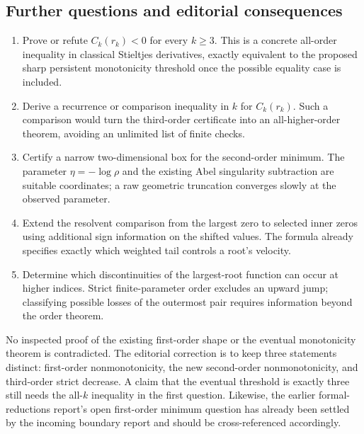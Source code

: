 \documentclass[11pt,a4paper]{article}
\numberwithin{equation}{section}
\theoremstyle{definition}
\theoremstyle{remark}
\begin{document}
\subsection{Further questions and editorial consequences}

\begin{enumerate}
\item Prove or refute $C_k(r_k)<0$ for every $k\geq3$. This is a
      concrete all-order inequality in classical Stieltjes derivatives,
      exactly equivalent to the proposed sharp persistent monotonicity
      threshold once the possible equality case is included.
\item Derive a recurrence or comparison inequality in $k$ for
      $C_k(r_k)$. Such a comparison would turn the third-order certificate
      into an all-higher-order theorem, avoiding an unlimited list of
      finite checks.
\item Certify a narrow two-dimensional box for the second-order minimum.
      The parameter $\eta=-\log\rho$ and the existing Abel singularity
      subtraction are suitable coordinates; a raw geometric truncation
      converges slowly at the observed parameter.
\item Extend the resolvent comparison from the largest zero to selected
      inner zeros using additional sign information on the shifted
      values. The formula already specifies exactly which weighted
      tail controls a root's velocity.
\item Determine which discontinuities of the largest-root function can
      occur at higher indices. Strict finite-parameter order excludes
      an upward jump; classifying possible losses of the outermost pair
      requires information beyond the order theorem.
\end{enumerate}

No inspected proof of the existing first-order shape or the eventual
monotonicity theorem is contradicted. The editorial correction is to
keep three statements distinct: first-order nonmonotonicity, the new
second-order nonmonotonicity, and third-order strict decrease. A claim
that the eventual threshold is exactly three still needs the all-$k$
inequality in the first question. Likewise, the earlier formal-reductions
report's open first-order minimum question has already been settled by
the incoming boundary report and should be cross-referenced accordingly.


\end{document}

